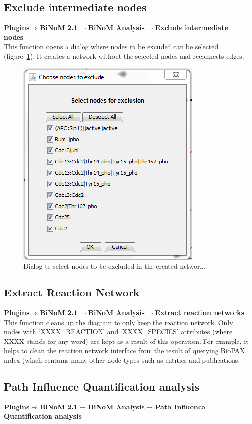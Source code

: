 \subsection{Exclude intermediate nodes}
\textbf{Plugins$\Rightarrow$BiNoM 2.1$\Rightarrow$BiNoM Analysis$\Rightarrow$Exclude intermediate nodes}\\
This function opens a dialog where nodes to be excuded can be selected (figure~\ref{Exclude_nodes_Dialog}). It creates a network without the selected nodes and reconnects edges.
\begin{figure}
\centering
\includegraphics[width=7 cm]{graphics/Exclude_nodes_Dialog}
\caption{Dialog to select nodes to be excluded in the created network.}
\label{Exclude_nodes_Dialog}
\end{figure}

\subsection{Extract Reaction Network}
\textbf{Plugins$\Rightarrow$BiNoM 2.1$\Rightarrow$BiNoM Analysis$\Rightarrow$Extract reaction networks}\\
This function cleans up the diagram to only keep the reaction network. Only nodes with ‘XXXX\_REACTION’ and ‘XXXX\_SPECIES’ attributes (where XXXX stands for any word) are kept as a result of this operation. For example, it helps to clean the reaction network interface from the result of querying BioPAX index (which contains many other node types such as entities and publications.

\subsection{Path Influence Quantification analysis}
\textbf{Plugins$\Rightarrow$BiNoM 2.1$\Rightarrow$BiNoM Analysis$\Rightarrow$Path Influence Quantification analysis}\\

